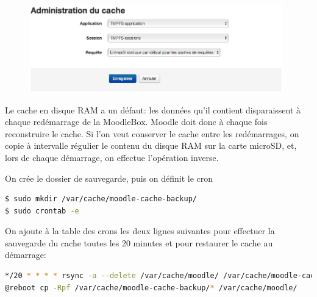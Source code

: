 \documentclass[12pt]{article}
\begin{document}
\begin{figure}[!ht]
\begin{minipage}[b]{\linewidth}
\centering
\includegraphics[width=11cm]{cache-association.png}
\end{minipage}
\end{figure}

Le cache en disque RAM a un défaut: les données qu'il contient disparaissent à chaque redémarrage de la MoodleBox.
Moodle doit donc à chaque fois reconstruire le cache.
Si l'on veut conserver le cache entre les redémarrages, on copie à intervalle régulier le contenu du disque RAM sur la carte microSD, et, lors de chaque démarrage, on effectue l'opération inverse.

On crée le dossier de sauvegarde, puis on définit le cron
\begin{lstlisting}[language=bash]
$ sudo mkdir /var/cache/moodle-cache-backup/
$ sudo crontab -e
\end{lstlisting}

On ajoute à la table des crons les deux lignes suivantes pour effectuer la sauvegarde du cache toutes les 20 minutes et pour restaurer le cache au démarrage:
\begin{lstlisting}[language=bash]
*/20 * * * * rsync -a --delete /var/cache/moodle/ /var/cache/moodle-cache-backup/
@reboot cp -Rpf /var/cache/moodle-cache-backup/* /var/cache/moodle/
\end{lstlisting}
\end{document}
